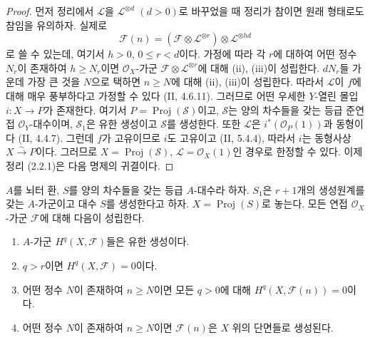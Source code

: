 \begin{proof}
먼저 정리에서 $\mathcal L$을 $\mathcal L^{\otimes d}$ $(d>0)$로
바꾸었을 때 정리가 참이면 원래 형태로도 참임을 유의하자. 실제로
\[
\mathcal F(n)
=(\mathcal F\otimes\mathcal L^{\otimes r})
\otimes\mathcal L^{\otimes hd}
\]
로 쓸 수 있는데, 여기서 $h>0$, $0\leq r<d$이다. 가정에 따라 각
$r$에 대하여 어떤 정수 $N_r$이 존재하여 $h\geq N_r$이면
$\mathcal O_X$-가군 $\mathcal F\otimes\mathcal L^{\otimes r}$에 대해
(ii), (iii)이 성립한다. $dN_r$들 가운데 가장 큰 것을 $N$으로 택하면
$n\geq N$에 대해 (ii), (iii)이 성립한다. 따라서 $\mathcal L$이
$f$에 대해 매우 풍부하다고 가정할 수 있다 (II, 4.6.11). 그러므로
어떤 우세한 $Y$-열린 몰입 $i:X\to P$가 존재한다. 여기서
$P=\operatorname{Proj}(\mathcal S)$이고, $\mathcal S$는 양의 차수들을
갖는 등급 준연접 $\mathcal O_Y$-대수이며, $\mathcal S_1$은 유한
생성이고 $\mathcal S$를 생성한다. 또한 $\mathcal L$은
$i^*(\mathcal O_P(1))$과 동형이다 (II, 4.4.7). 그런데 $f$가 고유이므로
$i$도 고유이고 (II, 5.4.4), 따라서 $i$는 동형사상
$X\xrightarrow{\sim}P$이다. 그러므로
$X=\operatorname{Proj}(\mathcal S)$, $\mathcal L=\mathcal O_X(1)$인
경우로 한정할 수 있다. 이제 정리 (2.2.1)은 다음 명제의 귀결이다.
\end{proof}

\begin{proposition}[2.2.2]
\label{III.2.2.2-fr}
$A$를 뇌터 환, $S$를 양의 차수들을 갖는 등급 $A$-대수라 하자.
$S_1$은 $r+1$개의 생성원계를 갖는 $A$-가군이고 대수 $S$를 생성한다고
하자. $X=\operatorname{Proj}(S)$로 놓는다. 모든 연접
$\mathcal O_X$-가군 $\mathcal F$에 대해 다음이 성립한다.
\begin{enumerate}
\item[{\rm(i)}] $A$-가군 $H^q(X,\mathcal F)$들은 유한 생성이다.
\item[{\rm(ii)}] $q>r$이면 $H^q(X,\mathcal F)=0$이다.
\item[{\rm(iii)}] 어떤 정수 $N$이 존재하여 $n\geq N$이면 모든
$q>0$에 대해 $H^q(X,\mathcal F(n))=0$이다.
\item[{\rm(iv)}] 어떤 정수 $N$이 존재하여 $n\geq N$이면
$\mathcal F(n)$은 $X$ 위의 단면들로 생성된다.
\end{enumerate}
\end{proposition}

